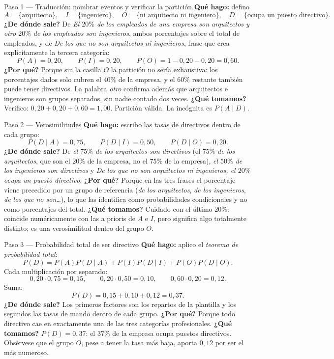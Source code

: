 \documentclass[11pt]{article}
\begin{document}
\begin{sol}

\begin{paso}{Paso 1 --- Traducción: nombrar eventos y verificar la partición}
\textbf{Qué hago:} defino
\[
A=\{\text{arquitecto}\},\quad I=\{\text{ingeniero}\},\quad O=\{\text{ni arquitecto ni ingeniero}\},\quad D=\{\text{ocupa un puesto directivo}\}.
\]
\textbf{¿De dónde sale?} De \emph{El $20\%$ de los empleados de una empresa son arquitectos y otro $20\%$ de los empleados son ingenieros}, ambos porcentajes sobre el total de empleados, y de \emph{De los que no son arquitectos ni ingenieros}, frase que crea explícitamente la tercera categoría:
\[
P(A)=0,20,\qquad P(I)=0,20,\qquad P(O)=1-0,20-0,20=0,60.
\]
\textbf{¿Por qué?} Porque sin la casilla $O$ la partición no sería exhaustiva: los porcentajes dados solo cubren el $40\%$ de la empresa, y el $60\%$ restante también puede tener directivos. La palabra \emph{otro} confirma además que arquitectos e ingenieros son grupos separados, sin nadie contado dos veces.
\textbf{¿Qué tomamos?} Verifico: $0,20+0,20+0,60=1,00$. Partición válida. La incógnita es $P(A\mid D)$.
\end{paso}

\begin{paso}{Paso 2 --- Verosimilitudes}
\textbf{Qué hago:} escribo las tasas de directivos dentro de cada grupo:
\[
P(D\mid A)=0,75,\qquad P(D\mid I)=0,50,\qquad P(D\mid O)=0,20.
\]
\textbf{¿De dónde sale?} De \emph{el $75\%$ de los arquitectos son directivos} (el $75\%$ \emph{de los arquitectos}, que son el $20\%$ de la empresa, no el $75\%$ de la empresa), \emph{el $50\%$ de los ingenieros son directivos} y \emph{De los que no son arquitectos ni ingenieros, el $20\%$ ocupa un puesto directivo}.
\textbf{¿Por qué?} Porque en las tres frases el porcentaje viene precedido por un grupo de referencia (\emph{de los arquitectos}, \emph{de los ingenieros}, \emph{de los que no son\ldots}), lo que las identifica como probabilidades condicionales y no como porcentajes del total.
\textbf{¿Qué tomamos?} Cuidado con el último $20\%$: coincide numéricamente con las a prioris de $A$ e $I$, pero significa algo totalmente distinto; es una verosimilitud dentro del grupo $O$.
\end{paso}

\begin{paso}{Paso 3 --- Probabilidad total de ser directivo}
\textbf{Qué hago:} aplico el \emph{teorema de probabilidad total}:
\[
P(D)=P(A)P(D\mid A)+P(I)P(D\mid I)+P(O)P(D\mid O).
\]
Cada multiplicación por separado:
\[
0,20\cdot 0,75=0,15,\qquad 0,20\cdot 0,50=0,10,\qquad 0,60\cdot 0,20=0,12.
\]
Suma:
\[
P(D)=0,15+0,10+0,12=0,37.
\]
\textbf{¿De dónde sale?} Los primeros factores son los repartos de la plantilla y los segundos las tasas de mando dentro de cada grupo.
\textbf{¿Por qué?} Porque todo directivo cae en exactamente una de las tres categorías profesionales.
\textbf{¿Qué tomamos?} $P(D)=0,37$: el $37\%$ de la empresa ocupa puestos directivos. Obsérvese que el grupo $O$, pese a tener la tasa más baja, aporta $0,12$ por ser el más numeroso.
\end{paso}


\end{sol}
\end{document}

